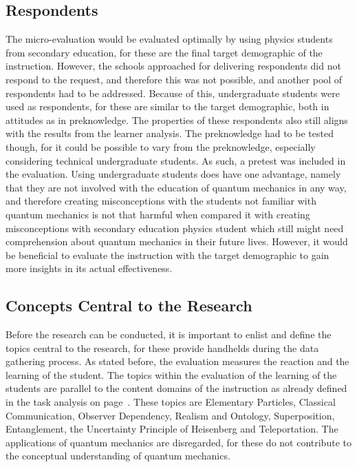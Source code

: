\documentclass[11pt,twoside]{report} %
\begin{document}
\subsection{Respondents}

The micro-evaluation would be evaluated optimally by using physics students from secondary education, for these are the final target demographic of the instruction. However, the schools approached for delivering respondents did not respond to the request, and therefore this was not possible, and another pool of respondents had to be addressed. Because of this, undergraduate students were used as respondents, for these are similar to the target demographic, both in attitudes as in preknowledge. The properties of these respondents also still aligns with the results from the learner analysis. The preknowledge had to be tested though, for it could be possible to vary from the preknowledge, especially considering technical undergraduate students. As such, a pretest was included in the evaluation. Using undergraduate students does have one advantage, namely that they are not involved with the education of quantum mechanics in any way, and therefore creating misconceptions with the students not familiar with quantum mechanics is not that harmful when compared it with creating misconceptions with secondary education physics student which still might need comprehension about quantum mechanics in their future lives. However, it would be beneficial to evaluate the instruction with the target demographic to gain more insights in its actual effectiveness.

\subsection{Concepts Central to the Research}
\label{subsec:evaconcepts}

Before the research can be conducted, it is important to enlist and define the topics central to the research, for these provide handhelds during the data gathering process. As stated before, the evaluation measures the reaction and the learning of the student. The topics within the evaluation of the learning of the students are parallel to the content domains of the instruction as already defined in the task analysis on page~\pageref{ch:taskanalysis}. These topics are Elementary Particles, Classical Communication, Observer Dependency, Realism and Ontology, Superposition, Entanglement, the Uncertainty Principle of Heisenberg and Teleportation. The applications of quantum mechanics are disregarded, for these do not contribute to the conceptual understanding of quantum mechanics.
\end{document}
